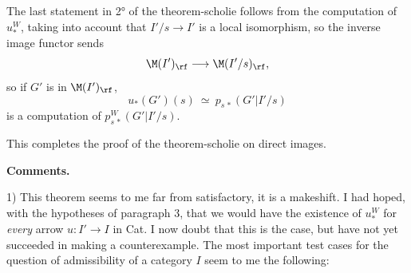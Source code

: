 

The last statement in 2° of the theorem-scholie follows from the computation of $u_*^W$, taking into account that $I'/s \longrightarrow I'$ is a local isomorphism, so the inverse image functor sends
\[
\M(I')_{\rf} \longrightarrow \M(I'/s)_{\rf},
\]
so if $G'$ is in $\M(I')_{\rf}$,
\[
u_*(G')(s) \ \simeq\ p_{s\,*}(G'|I'/s)
\]
is a computation of $p^W_{s\,*}(G'|I'/s)$.

This completes the proof of the theorem-scholie on direct images.

\textbf{Comments.}

1) This theorem seems to me far from satisfactory, it is a makeshift. I had hoped, with the hypotheses of paragraph 3, that we would have the existence of $u_*^W$ for \textit{every} arrow $u : I' \longrightarrow I$ in Cat. I now doubt that this is the case, but have not yet succeeded in making a counterexample. The most important test cases for the question of admissibility of a category $I$ seem to me the following:

